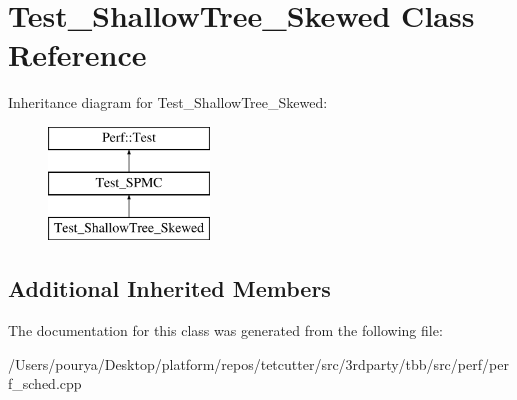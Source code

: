 \hypertarget{classTest__ShallowTree__Skewed}{}\section{Test\+\_\+\+Shallow\+Tree\+\_\+\+Skewed Class Reference}
\label{classTest__ShallowTree__Skewed}
Inheritance diagram for Test\+\_\+\+Shallow\+Tree\+\_\+\+Skewed\+:\begin{figure}[H]
\begin{center}
\leavevmode
\includegraphics[height=3.000000cm]{classTest__ShallowTree__Skewed}
\end{center}
\end{figure}
\subsection*{Additional Inherited Members}


The documentation for this class was generated from the following file\+:\begin{DoxyCompactItemize}
\item 
/\+Users/pourya/\+Desktop/platform/repos/tetcutter/src/3rdparty/tbb/src/perf/perf\+\_\+sched.\+cpp\end{DoxyCompactItemize}
